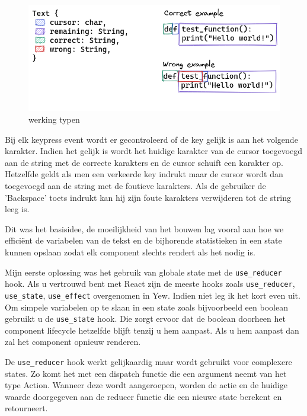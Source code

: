 \begin{figure}
  \includegraphics[width=\linewidth]{./figures/text.png}
  \caption{werking typen}
\end{figure}

Bij elk keypress event wordt er gecontroleerd of de key gelijk is aan het volgende karakter. Indien
het gelijk is wordt het huidige karakter van de cursor toegevoegd aan de string met de correcte
karakters en de cursor schuift een karakter op. Hetzelfde geldt als men een verkeerde key indrukt
maar de cursor wordt dan toegevoegd aan de string met de foutieve karakters. Als de gebruiker de
'Backspace' toets indrukt kan hij zijn foute karakters verwijderen tot de string leeg is. 

\clearpage

Dit was het basisidee, de moeilijkheid van het bouwen lag vooral aan hoe we efficiënt de variabelen
van de tekst en de bijhorende statistieken in een state kunnen opslaan zodat elk component slechts
rendert als het nodig is.  

Mijn eerste oplossing was het gebruik van globale state met de \texttt{use_reducer} hook.
Als u vertrouwd bent met React zijn de meeste hooks zoals \texttt{use_reducer},
\texttt{use_state}, \texttt{use_effect} overgenomen in Yew. Indien niet leg ik
het kort even uit. Om simpele variabelen op te slaan in een state zoals bijvoorbeeld een boolean
gebruikt u de \texttt{use_state} hook. Die zorgt ervoor dat de boolean doorheen het
component lifecycle hetzelfde blijft tenzij u hem aanpast. Als u hem aanpast dan zal het component
opnieuw renderen.  

De \texttt{use_reducer} hook werkt gelijkaardig maar wordt gebruikt voor complexere
states. Zo komt het met een dispatch functie die een argument neemt van het type Action. Wanneer
deze wordt aangeroepen, worden de actie en de huidige waarde doorgegeven aan de reducer functie die
een nieuwe state berekent en retourneert.


